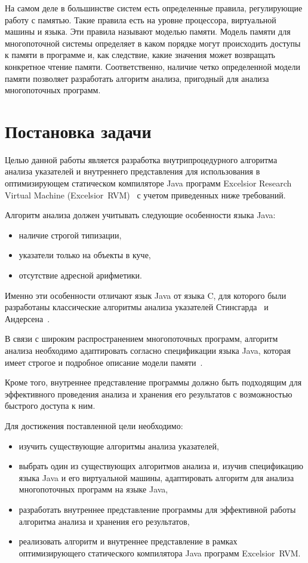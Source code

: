 \documentclass[14pt,titlepage]{extarticle}
\newcommand{\eng}[1]{{\English#1}}
\let\oldsection\section
\renewcommand{\section}{\newpage\oldsection}
\newcommand{\java}{\eng{Java}\xspace}
\begin{document}
      На самом деле в большинстве систем есть определенные правила,
      регулирующие работу с памятью. Такие правила есть на уровне процессора,
      виртуальной машины и языка. Эти правила называют моделью памяти.
      Модель памяти для многопоточной системы определяет в каком
      порядке могут происходить доступы к памяти в программе и, как следствие,
      какие значения может возвращать конкретное чтение памяти. Соответственно,
      наличие четко определенной модели памяти позволяет разработать алгоритм
      анализа, пригодный для анализа многопоточных программ.

  \section{Постановка задачи}

    Целью данной работы является разработка внутрипроцедурного алгоритма
    анализа указателей и внутреннего представления для использования в
    оптимизирующем статическом компиляторе \java программ \eng{Excelsior
    Research Virtual Machine (Excelsior~RVM)}~\cite{excelsior_jet} с учетом
    приведенных ниже требований.

    Алгоритм анализа должен учитывать следующие особенности языка \java:
    \begin{itemize}
      \item наличие строгой типизации,
      \item указатели только на объекты в куче,
      \item отсутствие адресной арифметики.
    \end{itemize}
    Именно эти особенности отличают язык \java от языка C, для которого были
    разработаны классические алгоритмы анализа указателей
    Стинсгарда~\cite{steensgaard} и Андерсена~\cite{andersen}.

    В связи с широким распространением многопоточных программ, алгоритм анализа
    необходимо адаптировать согласно спецификации языка \java, которая имеет
    строгое и подробное описание модели памяти~\cite{manson_jmm}.

    Кроме того, внутреннее представление программы должно быть подходящим для
    эффективного проведения анализа и хранения его результатов с возможностью
    быстрого доступа к ним.

    Для достижения поставленной цели необходимо:
    \begin{itemize}
      \item изучить существующие алгоритмы анализа указателей,
      \item выбрать один из существующих алгоритмов анализа и, изучив
            спецификацию языка \java и его виртуальной машины, адаптировать
            алгоритм для анализа многопоточных программ на языке \java,
      \item разработать внутреннее представление программы для эффективной
            работы алгоритма анализа и хранения его результатов,
      \item реализовать алгоритм и внутреннее представление в рамках
            оптимизирующего статического компилятора \java программ
            \eng{Excelsior~RVM}.
    \end{itemize}
\end{document}
